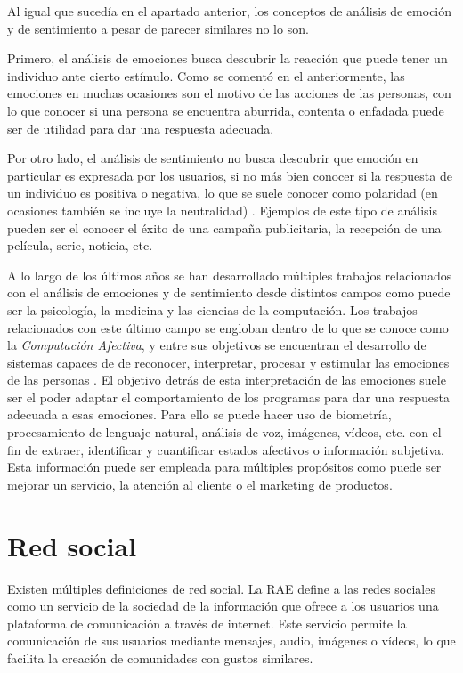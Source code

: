 Al igual que sucedía en el apartado anterior, los conceptos de análisis de emoción y de sentimiento a pesar de parecer similares no lo son.

Primero, el análisis de emociones busca descubrir la reacción que puede tener un individuo ante cierto estímulo. Como se comentó en el anteriormente, las emociones en muchas ocasiones son el motivo de las acciones de las personas, con lo que conocer si una persona se encuentra aburrida, contenta o enfadada puede ser de utilidad para dar una respuesta adecuada.

Por otro lado, el análisis de sentimiento no busca descubrir que emoción en particular es expresada por los usuarios, si no más bien conocer si la respuesta de un individuo es positiva o negativa, lo que se suele conocer como polaridad (en ocasiones también se incluye la neutralidad) \cite{analyticssteps}. Ejemplos de este tipo de análisis pueden ser el conocer el éxito de una campaña publicitaria, la recepción de una película, serie, noticia, etc.

A lo largo de los últimos años se han desarrollado múltiples trabajos relacionados con el análisis de emociones y de sentimiento desde distintos campos como puede ser la psicología, la medicina y las ciencias de la computación. Los trabajos relacionados con este último campo se engloban dentro de lo que se conoce como la \textit{Computación Afectiva}, y entre sus objetivos se encuentran el desarrollo de sistemas capaces de de reconocer, interpretar, procesar y estimular las emociones de las personas \cite{bbva_comp_afec}. El objetivo detrás de esta interpretación de las emociones suele ser el poder adaptar el comportamiento de los programas para dar una respuesta adecuada a esas emociones. Para ello se puede hacer uso de biometría, procesamiento de lenguaje natural, análisis de voz, imágenes, vídeos, etc. con el fin de extraer, identificar y cuantificar estados afectivos o información subjetiva. Esta información puede ser empleada para múltiples propósitos como puede ser mejorar un servicio, la atención al cliente o el marketing de productos.

\section{Red social}

Existen múltiples definiciones de red social. La RAE define a las redes sociales como un \guillemotleft servicio de la sociedad de la información que ofrece a los usuarios una plataforma de comunicación a través de internet\guillemotright. Este servicio permite la comunicación de sus usuarios mediante mensajes, audio, imágenes o vídeos, lo que facilita la creación de comunidades con gustos similares.

